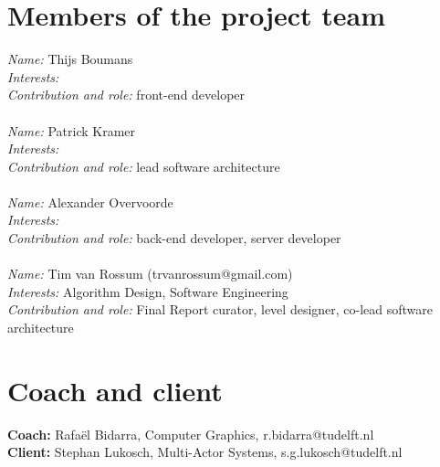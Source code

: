 \documentclass[]{article}
\begin{document}
\section*{Members of the project team}
\textit{Name:} Thijs Boumans\\
\textit{Interests:}\\
\textit{Contribution and role:} front-end developer\\
\\
\textit{Name:} Patrick Kramer\\
\textit{Interests:}\\
\textit{Contribution and role:} lead software architecture\\
\\
\textit{Name:} Alexander Overvoorde\\
\textit{Interests:}\\
\textit{Contribution and role:} back-end developer, server developer\\
\\
\textit{Name:} Tim van Rossum (trvanrossum@gmail.com)\\
\textit{Interests:} Algorithm Design, Software Engineering \\
\textit{Contribution and role:} Final Report curator, level designer, co-lead software architecture\\

\section*{Coach and client}
\textbf{Coach:} Rafa\"el Bidarra, Computer Graphics, r.bidarra@tudelft.nl\\
\textbf{Client:} Stephan Lukosch, Multi-Actor Systems, s.g.lukosch@tudelft.nl
\end{document}
